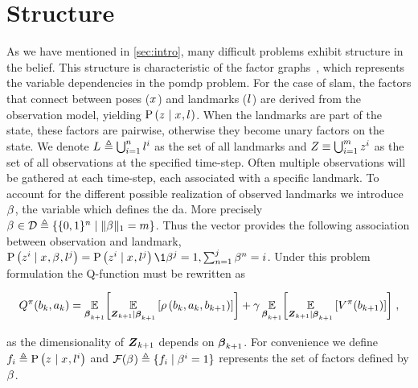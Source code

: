 \section{Structure}
As we have mentioned in \cref{sec:intro}, many difficult problems exhibit structure in the belief. This structure is characteristic of the factor graphs~\cite{Koller09book}, which represents the variable dependencies in the \gls{pomdp} problem. For the case of \gls{slam}, the factors that connect between poses ($\state{}$) and landmarks ($\landmark{}$) are derived from the observation model, yielding $\probcond{\observation{}{}}{\state{},\landmark{}}$. When the landmarks are part of the state, these factors are pairwise, otherwise they become unary factors on the state. We denote $\landmarks{}\triangleq\bigcup_{i=1}^n\landmark{i}$ as the set of all landmarks and $\observations{}\equiv\bigcup_{i=1}^m\observation{}{i}$ as the set of all observations at the specified time-step. Often multiple observations will be gathered at each time-step, each associated with a specific landmark. To account for the different possible realization of observed landmarks we introduce $\da{}{}$, the variable which defines the \gls{da}. More precisely $\da{}{}\in\mathcal{D}\triangleq\left\{\{0,1\}^{n}\mid\norm{\da{}{}}_1=m\right\}$. Thus the vector provides the following association between observation and landmark, $\probcond{\observation{}{i}}{\state{},\da{}{},\landmark{j}}=\probcond{\observation{}{i}}{\state{},\landmark{j}}\1{\da{}{j}=1,\sum_{n=1}^{j}\da{}{n}=i}$. Under this problem formulation the Q-function must be rewritten as
\begin{small}
	\begin{equation}
		Q^\pi(\blf{k},\action{k})=\E_{\daRV{k+1}{}}\biggl[{\expectation{\reward{\blf{k},\action{k},\blf{k+1}}}{\observationsRV{k+1}\mid\daRV{k+1}{}}}\biggr]+\gamma\E_{\daRV{k+1}{}}\biggl[\expectation{V^\pi(\blf{k+1})}{\observationsRV{k+1}\mid\daRV{k+1}{}}\biggr]\;,\label{eq:da_bellman}
	\end{equation}
\end{small}
as the dimensionality of $\observationsRV{k+1}$ depends on $\daRV{k+1}{}$. For convenience we define $f_i\triangleq\probcond{\observation{}{}}{\state{},\landmark{i}}$ and $\mathcal{F}(\da{}{})\triangleq\{f_i\mid\da{}{i}=1\}$ represents the set of factors defined by $\da{}{}$.